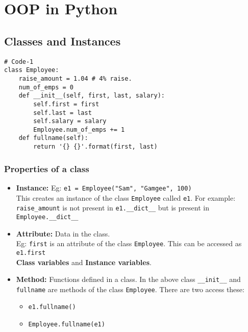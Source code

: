 \section{OOP in Python}

\subsection*{Classes and Instances}

\begin{mdframed}[backgroundcolor=gray!10,linecolor=Firebrick4]
\begin{verbatim}
# Code-1
class Employee:
    raise_amount = 1.04 # 4% raise.
    num_of_emps = 0
    def __init__(self, first, last, salary):
        self.first = first
        self.last = last
        self.salary = salary
        Employee.num_of_emps += 1
    def fullname(self):
        return '{} {}'.format(first, last)
\end{verbatim}
\end{mdframed}
\subsubsection*{Properties of a class}

\begin{itemize}
    \item \textbf{Instance:} Eg: \texttt{e1 = Employee("Sam", "Gamgee", 100)}\\
    This creates an instance of the class \texttt{Employee} called \texttt{e1}.
    For example: \texttt{raise\_amount} is not present in \texttt{e1.\_\_dict\_\_} but is present in \texttt{Employee.\_\_dict\_\_}

    \item \textbf{Attribute:} Data in the class.\\
    Eg: \texttt{first} is an attribute of the class \texttt{Employee}. This can be accessed as \texttt{e1.first}\\
    \textbf{Class variables} and \textbf{Instance variables}.

    \item \textbf{Method:} Functions defined in a class. In the above class \texttt{\_\_init\_\_} and \texttt{fullname} are methods of the class \texttt{Employee}. There are two access these:
    \begin{itemize}
        \item \texttt{e1.fullname()}
        \item \texttt{Employee.fullname(e1)}
    \end{itemize}
\end{itemize}

